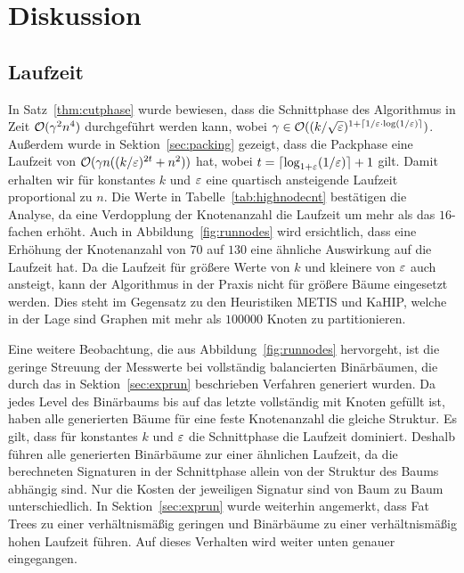 
\chapter{Diskussion}\label{chapter:diskussion}
\section{Laufzeit}
In Satz~\ref{thm:cutphase} wurde bewiesen, dass die Schnittphase des Algorithmus in Zeit $\mathcal{O}(\gamma^2 n^4)$ durchgeführt werden kann, wobei $\gamma \in \mathcal{O}((k/\sqrt{\varepsilon})^{1+\lceil1/\varepsilon \cdot \log(1/\varepsilon)\rceil})$.
Außerdem wurde in Sektion~\ref{sec:packing} gezeigt, dass die Packphase eine Laufzeit von $\mathcal{O}(\gamma n ((k/\varepsilon)^{2t} + n^2))$ hat, wobei $t = \lceil\log_{1 + \varepsilon}(1/\varepsilon)\rceil + 1$ gilt.
Damit erhalten wir für konstantes $k$ und $\varepsilon$ eine quartisch ansteigende Laufzeit proportional zu $n$.
Die Werte in Tabelle~\ref{tab:highnodecnt} bestätigen die Analyse, da eine Verdopplung der Knotenanzahl die Laufzeit um mehr als das $16$\hyp fachen erhöht.
Auch in Abbildung~\ref{fig:runnodes} wird ersichtlich, dass eine Erhöhung der Knotenanzahl von $70$ auf $130$ eine ähnliche Auswirkung auf die Laufzeit hat.
Da die Laufzeit für größere Werte von $k$ und kleinere von $\varepsilon$ auch ansteigt, kann der Algorithmus in der Praxis nicht für größere Bäume eingesetzt werden.
Dies steht im Gegensatz zu den Heuristiken METIS und KaHIP, welche in der Lage sind Graphen mit mehr als $100000$ Knoten zu partitionieren.~\cite{KK98, SS13}

Eine weitere Beobachtung, die aus Abbildung~\ref{fig:runnodes} hervorgeht, ist die geringe Streuung der Messwerte bei vollständig balancierten Binärbäumen, die durch das in Sektion~\ref{sec:exprun} beschrieben Verfahren generiert wurden.
Da jedes Level des Binärbaums bis auf das letzte vollständig mit Knoten gefüllt ist, haben alle generierten Bäume für eine feste Knotenanzahl die gleiche Struktur.
Es gilt, dass für konstantes $k$ und $\varepsilon$ die Schnittphase die Laufzeit dominiert.
Deshalb führen alle generierten Binärbäume zur einer ähnlichen Laufzeit, da die berechneten Signaturen in der Schnittphase allein von der Struktur des Baums abhängig sind.
Nur die Kosten der jeweiligen Signatur sind von Baum zu Baum unterschiedlich.
In Sektion~\ref{sec:exprun} wurde weiterhin angemerkt, dass Fat Trees zu einer verhältnismäßig geringen und Binärbäume zu einer verhältnismäßig hohen Laufzeit führen.
Auf dieses Verhalten wird weiter unten genauer eingegangen.

